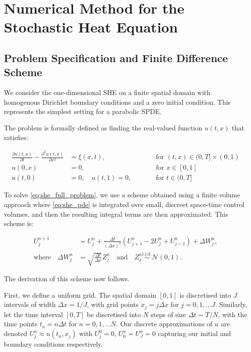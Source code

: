 \section{Numerical Method for the Stochastic Heat Equation}
\subsection{Problem Specification and Finite Difference Scheme}

We consider the one-dimensional SHE on a finite spatial domain with 
homogenous Dirichlet boundary conditions and a zero initial condition.
This represents the simplest setting for a parabolic SPDE.

The problem is formally defined as finding the real-valued 
function $u(t,x)$ that satisfies:

\begin{subequations} \label{eq:she_full_problem}
\begin{align}
    \frac{\partial u(t,x)}{\partial t} - \frac{\partial^2 u(t,x)}{\partial x^2} &= \xi(x,t),
    \qquad &&\text{for } (t,x) \in (0, T] \times (0,1) \label{eq:she_pde} \\
    u(0,x) &= 0, \qquad &&\text{for } x \in [0,1] \label{eq:she_ic} \\
    u(t,0) &= 0, \quad u(t,1) = 0, \qquad &&\text{for } t \in (0, T] \label{eq:she_bc}
\end{align}
\end{subequations}

To solve \eqref{eq:she_full_problem}, we use a scheme 
obtained using a finite volume approach \cite{suli2025nspdes} where \eqref{eq:she_pde}
is integrated over small, discreet space-time control volumes, 
and then the resulting integral terms are then approximated.
This scheme is:

\begin{align}
    U_j^{n+1} &= U_j^n + \frac{\Delta t}{(\Delta x)^2} 
    (U_{j+1}^n - 2U_j^n + U_{j-1}^n) + \Delta W_j^n, \label{eq:she_scheme} \\
    \text{where} \quad \Delta W_j^n &= \sqrt{\frac{\Delta t}{\Delta x}} 
    Z_j^n \quad \text{and} \quad Z_j^n \overset{\mathrm{i.i.d.}}{\sim} \mathcal{N}(0,1). \nonumber
\end{align}

The derivation of this scheme now follows.

First, we define a uniform grid. The spatial domain 
$[0,1]$ is discretised into $J$ intervals of width 
$\Delta x = 1 / J$, with grid points $x_j = j \Delta x$ for 
$j = 0, 1, \dots J$. Similarly, let the time interval 
$[0, T]$ be discretised into $N$ steps of size $\Delta t 
= T / N$, with the time points $t_n = n \Delta t$ for 
$n = 0, 1, \dots N$. 
Our discrete approximations of $u$ are denoted $U_j^n \approx 
u(t_n, x_j)$ with $U_j^0 = 0$, $U_0^n = U_J^n = 0$ 
capturing our initial and boundary conditions respectively.

